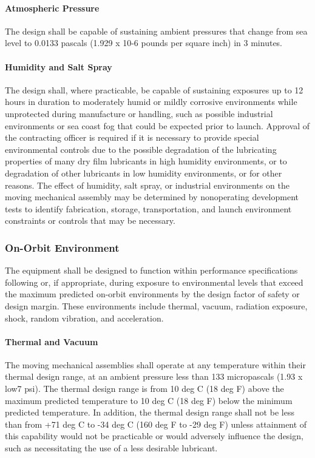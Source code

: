 \documentclass[12pt]{article}
\begin{document}
\paragraph{Atmospheric Pressure} %
The design shall be capable of sustaining ambient pressures that change from sea level to 0.0133 pascals (1.929 x 10-6 pounds per square inch) in 3 minutes.

\paragraph{Humidity and Salt Spray} %
The design shall, where practicable, be capable of sustaining exposures up to 12 hours in duration to moderately humid or mildly corrosive environments while unprotected during manufacture or handling, such as possible industrial environments or sea coast fog that could be expected prior to launch. 
Approval of the contracting officer is required if it is necessary to provide special environmental controls due to the possible degradation of the lubricating properties of many dry film lubricants in high humidity environments, or to degradation of other lubricants in low humidity environments, or for other reasons. 
The effect of humidity, salt spray, or industrial environments on the moving mechanical assembly may be determined by nonoperating development tests to identify fabrication, storage, transportation, and launch environment constraints or controls that may be necessary.

\subsubsection{On-Orbit Environment} %
The equipment shall be designed to function within performance specifications following or, if appropriate, during exposure to environmental levels that exceed the maximum predicted on-orbit environments by the design factor of safety or design margin. 
These environments include thermal, vacuum, radiation exposure, shock, random vibration, and acceleration.

\paragraph{Thermal and Vacuum} %
The moving mechanical assemblies shall operate at any temperature within their thermal design range, at an ambient pressure less than 133 micropascals (1.93 x low7 psi). 
The thermal design range is from 10 deg C (18 deg F) above the maximum predicted temperature to 10 deg C (18 deg F) below the minimum predicted temperature.
In addition, the thermal design range shall not be less than from +71 deg C to -34 deg C (160 deg F to -29 deg F) unless attainment of this capability would not be practicable or would adversely influence the design, such as necessitating the use of a less desirable lubricant.
\end{document}
